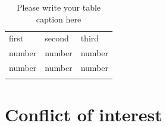 %
\begin{table}
\caption{Please write your table caption here}
\label{tab:1}       %
\begin{tabular}{lll}
\hline\noalign{\smallskip}
first & second & third  \\
\noalign{\smallskip}\hline\noalign{\smallskip}
number & number & number \\
number & number & number \\
\noalign{\smallskip}\hline
\end{tabular}
\end{table}


\begin{acknowledgements}
\end{acknowledgements}

%
\section*{Conflict of interest}
%





